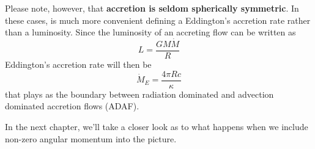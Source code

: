 \par Please note, however, that \textbf{accretion is seldom spherically symmetric}. In these cases, is much more convenient defining a Eddington's accretion rate rather than a luminosity. Since the luminosity of an accreting flow can be written as 
\begin{equation*}
    L = \frac{GM\dot{M}}{R}
\end{equation*}
Eddington's accretion rate will then be 
\begin{equation}
    \dot{M}_{E} = \frac{4\pi R c}{\kappa}
    \label{eq_eddingon_accrate}
\end{equation}
that plays as the boundary between radiation dominated and advection dominated accretion flows (ADAF).
\par In the next chapter, we'll take a closer look as to what happens when we include non-zero angular momentum into the picture.


